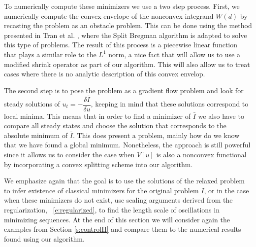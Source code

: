 \documentclass[11pt]{article}
\theoremstyle{plain}
\begin{document}
To numerically compute these minimizers we use a two step process. First, we numerically compute the convex envelope of the nonconvex integrand $W(d)$ by recasting the problem as an obstacle problem. This can be done using the method presented in Tran et al. \cite{tran2015}, where the Split Bregman algorithm is adapted to solve this type of problems. The result of this process is a piecewise linear function that plays a similar role to the $L^1$ norm, a nice fact that will allow us to use a modified shrink operator as part of our algorithm. This will also allow us to treat cases where there is no analytic description of this convex envelop. 

The second step is to pose the problem as a gradient flow problem and look for steady solutions of  $u_t = -\dfrac{\delta \overline{I}}{\delta u}$, keeping in mind that these solutions correspond to local minima. This means that in order to find a minimizer of $\bar{I}$ we also have to compare all steady states and choose the solution that corresponds to the absolute minimum of $\bar{I}$. This does present a problem, mainly how do we know that we have found a global minimum. Nonetheless, the approach is still powerful since it allows us to consider the case when $V[u]$ is also a nonconvex functional by incorporating a convex splitting scheme into our algorithm. 
 
We emphasize again that the goal is to use the solutions of the relaxed problem to infer existence of classical minimizers for the original problem $I$, or in the case when these minimizers do not exist, use scaling arguments derived from the regularization, ~\eqref{e:regularized}, to find the length scale of oscillations in minimizing sequences. At the end of this section we will consider again the examples from Section \ref{s:controlH} and compare them to the numerical results found using our algorithm.
\end{document}
